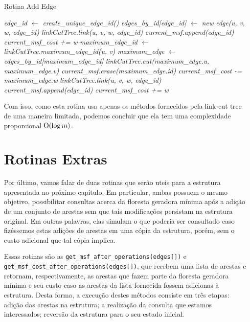 \begin{algorithm}[h!]
    \caption{Rotina Add Edge}\label{imsf-add-edge}
    \begin{algorithmic}
        \State \emph{edge\_id $\gets$ create\_unique\_edge\_id()}
        \State \emph{edges\_by\_id[edge\_id] $\gets$ new edge(u, v, w, edge\_id)}
        \State \emph{linkCutTree.link(u, v, w, edge\_id)}
        \State \emph{current\_msf.append(edge\_id)}
        \State \emph{current\_msf\_cost += w}
        \State \emph{maximum\_edge\_id $\gets$ linkCutTree.maximum\_edge\_id(u, v)}
        \State \emph{maximum\_edge $\gets$ edges\_by\_id[maximum\_edge\_id]}
        \State \emph{linkCutTree.cut(maximum\_edge.u, maximum\_edge.v)}
        \State \emph{current\_msf.erase(maximum\_edge.id)}
        \State \emph{current\_msf\_cost -= maximum\_edge.w}
        \State \emph{linkCutTree.link(u, v, w, edge\_id)}
        \State \emph{current\_msf.append(edge\_id)}
        \State \emph{current\_msf\_cost += w}
        \EndIf
        \EndFunction
    \end{algorithmic}
\end{algorithm}

Com isso, como esta rotina usa apenas os métodos fornecidos pela link-cut tree de uma maneira limitada, podemos concluir que ela tem uma complexidade proporcional $\mathrm{O}(\log m)$.

\section{Rotinas Extras}
\label{sec:imsf-extras}

Por último, vamos falar de duas rotinas que serão uteis para a estrutura apresentada no próximo capítulo. Em particular, ambas possuem o mesmo objetivo, possibilitar consultas acerca da floresta geradora mínima após a adição de um conjunto de arestas sem que tais modificações persistam na estrutura original. Em outras palavras, elas simulam o que poderia ser consultado caso fizéssemos estas adições de arestas em uma cópia da estrutura, porém, sem o custo adicional que tal cópia implica.

Essas rotinas são as \texttt{get\_msf\_after\_operations(edges[])} e \texttt{get\_msf\_cost\_after\_operations(edges[])}, que recebem uma lista de arestas e retornam, respectivamente, as arestas que fazem parte da floresta geradora mínima e seu custo caso as arestas da lista fornecida fossem adicionas à estrutura. Desta forma, a execução destes métodos consiste em três etapas: adição das arestas na estrutura; a realização da consulta que estamos interessados; reversão da estrutura para o seu estado inicial.

